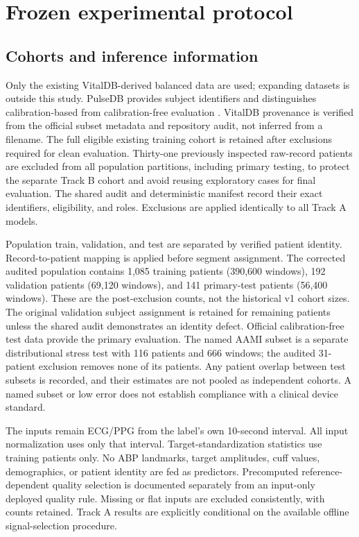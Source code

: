\documentclass[11pt]{article}
\begin{document}
\section{Frozen experimental protocol}
\subsection{Cohorts and inference information}
Only the existing VitalDB-derived balanced data are used; expanding datasets is outside this study. PulseDB provides subject identifiers and distinguishes calibration-based from calibration-free evaluation \citep{wang2023pulsedb}. VitalDB provenance is verified from the official subset metadata and repository audit, not inferred from a filename. The full eligible existing training cohort is retained after exclusions required for clean evaluation. Thirty-one previously inspected raw-record patients are excluded from all population partitions, including primary testing, to protect the separate Track B cohort and avoid reusing exploratory cases for final evaluation. The shared audit and deterministic manifest record their exact identifiers, eligibility, and roles. Exclusions are applied identically to all Track A models.

Population train, validation, and test are separated by verified patient identity. Record-to-patient mapping is applied before segment assignment. The corrected audited population contains 1,085 training patients (390,600 windows), 192 validation patients (69,120 windows), and 141 primary-test patients (56,400 windows). These are the post-exclusion counts, not the historical v1 cohort sizes. The original validation subject assignment is retained for remaining patients unless the shared audit demonstrates an identity defect. Official calibration-free test data provide the primary evaluation. The named AAMI subset is a separate distributional stress test with 116 patients and 666 windows; the audited 31-patient exclusion removes none of its patients. Any patient overlap between test subsets is recorded, and their estimates are not pooled as independent cohorts. A named subset or low error does not establish compliance with a clinical device standard.

The inputs remain ECG/PPG from the label's own 10-second interval. All input normalization uses only that interval. Target-standardization statistics use training patients only. No ABP landmarks, target amplitudes, cuff values, demographics, or patient identity are fed as predictors. Precomputed reference-dependent quality selection is documented separately from an input-only deployed quality rule. Missing or flat inputs are excluded consistently, with counts retained. Track A results are explicitly conditional on the available offline signal-selection procedure.
\end{document}
